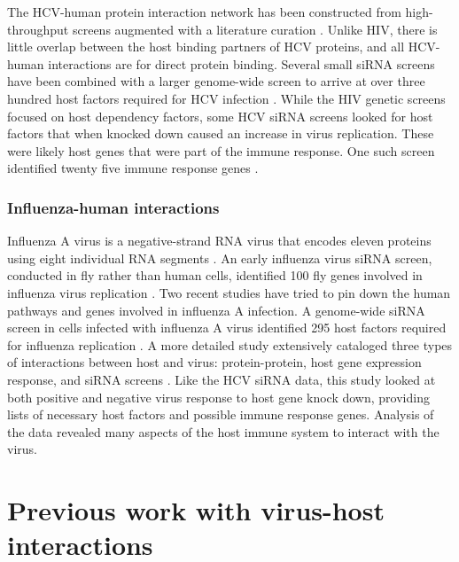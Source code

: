 The HCV-human protein interaction network has been constructed from
high-throughput screens augmented with a literature curation
\cite{dechassey08}. Unlike HIV, there is little overlap between the
host binding partners of HCV proteins, and all HCV-human interactions
are for direct protein binding. Several small siRNA screens have been
combined with a larger genome-wide screen to arrive at over three
hundred host factors required for HCV infection \cite{Li09}. While the
HIV genetic screens focused on host dependency factors, some HCV siRNA
screens looked for host factors that when knocked down caused an
increase in virus replication. These were likely host genes that were
part of the immune response. One such screen identified twenty five
immune response genes \cite{Li09}.

\subsubsection{Influenza-human interactions}

Influenza A virus is a negative-strand RNA virus that encodes eleven
proteins using eight individual RNA segments
\cite{clancy2008genetics}.  An early influenza virus siRNA screen,
conducted in fly rather than human cells, identified 100 fly genes
involved in influenza virus replication \cite{hao2008drosophila}. Two
recent studies have tried to pin down the human pathways and genes
involved in influenza A infection. A genome-wide siRNA screen in cells
infected with influenza A virus identified 295 host factors required
for influenza replication \cite{konig2009human}. A more detailed study
extensively cataloged three types of interactions between host and
virus: protein-protein, host gene expression response, and siRNA
screens \cite{shapira2009physical}. Like the HCV siRNA data, this
study looked at both positive and negative virus response to host gene
knock down, providing lists of necessary host factors and possible
immune response genes. Analysis of the data revealed many aspects of
the host immune system to interact with the virus.

\section{Previous work with virus-host interactions}

